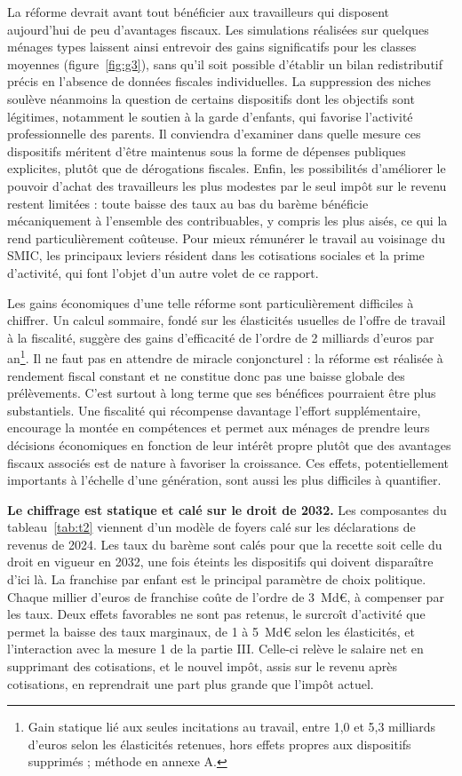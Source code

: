 \documentclass[10pt,a4paper]{article}
\begin{document}
La réforme devrait avant tout bénéficier aux travailleurs qui disposent aujourd’hui de peu d’avantages fiscaux. Les simulations réalisées sur quelques ménages types laissent ainsi entrevoir des gains significatifs pour les classes moyennes (figure~\ref{fig:g3}), sans qu’il soit possible d’établir un bilan redistributif précis en l’absence de données fiscales individuelles. La suppression des niches soulève néanmoins la question de certains dispositifs dont les objectifs sont légitimes, notamment le soutien à la garde d’enfants, qui favorise l’activité professionnelle des parents. Il conviendra d’examiner dans quelle mesure ces dispositifs méritent d’être maintenus sous la forme de dépenses publiques explicites, plutôt que de dérogations fiscales. Enfin, les possibilités d’améliorer le pouvoir d’achat des travailleurs les plus modestes par le seul impôt sur le revenu restent limitées : toute baisse des taux au bas du barème bénéficie mécaniquement à l’ensemble des contribuables, y compris les plus aisés, ce qui la rend particulièrement coûteuse. Pour mieux rémunérer le travail au voisinage du SMIC, les principaux leviers résident dans les cotisations sociales et la prime d’activité, qui font l’objet d’un autre volet de ce rapport.

Les gains économiques d’une telle réforme sont particulièrement difficiles à chiffrer. Un calcul sommaire, fondé sur les élasticités usuelles de l’offre de travail à la fiscalité, suggère des gains d’efficacité de l’ordre de 2 milliards d’euros par an\footnote{Gain statique lié aux seules incitations au travail, entre 1,0 et 5,3 milliards d'euros selon les élasticités retenues, hors effets propres aux dispositifs supprimés ; méthode en annexe A.}. Il ne faut pas en attendre de miracle conjoncturel : la réforme est réalisée à rendement fiscal constant et ne constitue donc pas une baisse globale des prélèvements. C’est surtout à long terme que ses bénéfices pourraient être plus substantiels. Une fiscalité qui récompense davantage l’effort supplémentaire, encourage la montée en compétences et permet aux ménages de prendre leurs décisions économiques en fonction de leur intérêt propre plutôt que des avantages fiscaux associés est de nature à favoriser la croissance. Ces effets, potentiellement importants à l’échelle d’une génération, sont aussi les plus difficiles à quantifier.



\textbf{Le chiffrage est statique et calé sur le droit de 2032.} Les composantes du tableau~\ref{tab:t2} viennent d'un
modèle de foyers calé sur les déclarations de revenus de 2024. Les taux du barème sont calés pour que la recette soit
celle du droit en vigueur en 2032, une fois éteints les dispositifs qui doivent disparaître d'ici là. La franchise par
enfant est le principal paramètre de choix politique. Chaque millier d'euros de franchise coûte de l'ordre de 3~Md€, à
compenser par les taux. Deux effets favorables ne sont pas retenus, le surcroît d'activité que permet la baisse des taux
marginaux, de 1 à 5~Md€ selon les élasticités, et l'interaction avec la mesure 1 de la partie III. Celle-ci relève le
salaire net en supprimant des cotisations, et le nouvel impôt, assis sur le revenu après cotisations, en reprendrait une
part plus grande que l'impôt actuel.
\end{document}
